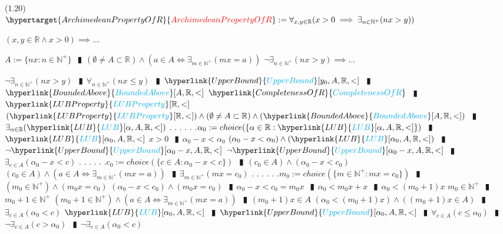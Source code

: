 \documentclass{book}
\newcommand{\df}[1]{\hypertarget{#1}{\textcolor{red}{#1}}}
\newcommand{\rf}[1]{\hyperlink{#1}{\textcolor{cyan}{#1}}}
\newcommand{\abr}{:=}
\newcommand{\cont}{\phantom{.}. . .\phantom{.}}
\newcommand{\pipe}{$\phantom{(}\vrectangleblack\phantom{)}$}
\begin{document}
(1.20) \\
$\df{ArchimedeanPropertyOfR} \abr \forall_{x, y \in \mathbb{R}}(x > 0 \implies \exists_{n \in \mathbb{N}^+}(n x > y))$
\begin{enumerate}
  \lit $(x, y \in \mathbb{R} \land x > 0) \implies \ldots$
  \begin{enumerate}
    \lit $A \abr \{n x : n \in \mathbb{N}^+\}$ \pipe $(\emptyset \neq A \subset \mathbb{R}) \land (a \in A \iff \exists_{m \in \mathbb{N}^+}(m x = a))$
    \lit $\lnot \exists_{n \in \mathbb{N}^+}(n x > y) \implies \ldots$
    \begin{enumerate}
      \lit $\lnot \exists_{n \in \mathbb{N}^+}(n x > y)$ \pipe $\forall_{n \in \mathbb{N}^+}(n x \leq y)$ \pipe $\rf{UpperBound}[y_0, A, \mathbb{R}, <]$ \pipe $\rf{BoundedAbove}[A, \mathbb{R}, <]$
      \lit $\rf{CompletenessOfR}$ \pipe $\rf{LUBProperty}[\mathbb{R}, <]$
      \lit $(\rf{LUBProperty}[\mathbb{R}, <]) \land (\emptyset \neq A \subset \mathbb{R}) \land (\rf{BoundedAbove}[A, \mathbb{R}, <])$ \pipe $\exists_{\alpha \in \mathbb{R}}(\rf{LUB}[\alpha, A, \mathbb{R}, <])$ \cont
      \lit \cont $\alpha_0 \abr choice(\{\alpha \in \mathbb{R} : \rf{LUB}[\alpha, A, \mathbb{R}, <]\})$ \pipe $\rf{LUB}[\alpha_0, A, \mathbb{R}, <]$
      \lit $x > 0$ \pipe $\alpha_0 - x < \alpha_0$
      \lit $(\alpha_0 - x < \alpha_0) \land (\rf{LUB}[\alpha_0, A, \mathbb{R}, <])$ \pipe $\lnot \rf{UpperBound}[\alpha_0 - x, A, \mathbb{R}, <]$
      \lit $\lnot \rf{UpperBound}[\alpha_0 - x, A, \mathbb{R}, <]$ \pipe $\exists_{c \in A}(\alpha_0 - x < c)$ \cont
      \lit \cont $c_0 \abr choice(\{c \in A : \alpha_0 - x < c\})$ \pipe $(c_0 \in A) \land (\alpha_0 - x < c_0)$
      \lit $(c_0 \in A) \land (a \in A \iff \exists_{m \in \mathbb{N}^+}(m x = a))$ \pipe $\exists_{m \in \mathbb{N}^+}(m x = c_0)$ \cont
      \lit \cont $m_0 \abr choice(\{m \in \mathbb{N}^+ : m x = c_0\})$ \pipe $(m_0 \in \mathbb{N}^+) \land (m_0 x = c_0)$
      \lit $(\alpha_0 - x < c_0) \land (m_0 x = c_0)$ \pipe $\alpha_0 - x < c_0 = m_0 x$ \pipe $\alpha_0 < m_0 x + x$ \pipe $\alpha_0 < (m_0 + 1) x$
      \lit $m_0 \in \mathbb{N}^+$ \pipe $m_0 + 1 \in \mathbb{N}^+$
      \lit $(m_0 + 1 \in \mathbb{N}^+) \land (a \in A \iff \exists_{m \in \mathbb{N}^+}(m x = a))$ \pipe $(m_0 + 1) x \in A$
      \lit $(\alpha_0 < (m_0 + 1) x) \land ((m_0 + 1) x \in A)$ \pipe $\exists_{c \in A}(\alpha_0 < c)$
      \lit $\rf{LUB}[\alpha_0, A, \mathbb{R}, <]$ \pipe $\rf{UpperBound}[\alpha_0, A, \mathbb{R}, <]$ \pipe $\forall_{c \in A}(c \leq \alpha_0)$ \pipe $\lnot \exists_{c \in A}(c > \alpha_0)$ \pipe $\lnot \exists_{c \in A}(\alpha_0 < c)$

\end{enumerate}
\end{enumerate}
\end{enumerate}
\end{document}
